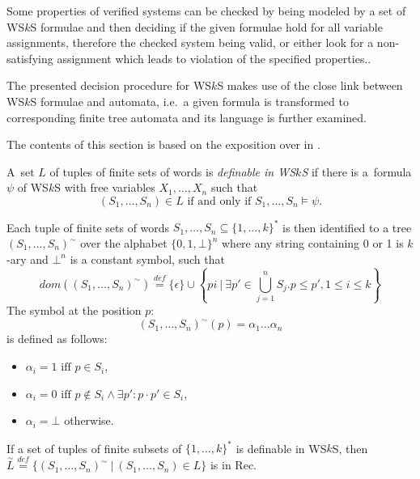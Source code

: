 Some properties of verified systems can be checked by being modeled by a set of
WS$k$S formulae and then deciding if the given formulae hold for all variable
assignments, therefore the checked system being valid, or either look for a
non-satisfying assignment which leads to violation of the specified properties..

The presented decision procedure for WS$k$S makes use of the close link between
WS$k$S formulae and automata, i.e.\ a given formula is transformed to
corresponding finite tree automata and its language is further examined. 

The contents of this section is based on the exposition over in \cite{tata}.

\begin{defz}
 A~set $L$ of tuples of finite sets of words is \emph{definable in WS$k$S} if
 there is a~formula $\psi$ of WS$k$S with free variables $X_1,\ldots,X_n$ such
 that \begin{equation}(S_1,\ldots,S_n) \in L \text{ if and only if }
 S_1,\ldots,S_n \models \psi.\end{equation}
\end{defz} Each tuple of finite sets of words $S_1,\ldots,S_n \subseteq
\{1,\ldots,k\}^*$ is then identified to a tree $(S_1,\ldots,S_n)^\sim$ over the
alphabet $\{0,1,\bot\}^n$ where any string containing 0 or 1 is $k$-ary and
$\bot^n$ is a constant symbol, such that
 \begin{equation}
  dom((S_1,\ldots,S_n)^\sim) \overset{\mathit{def}}{=} \{\epsilon\} \cup \left\{
  pi\ \Bigg|\ \exists p' \in \bigcup_{j = 1}^n S_j.p \leq p', 1 \leq i \leq
  k\right\}
 \end{equation}
The symbol at the position $p$: \begin{equation}(S_1,\ldots,S_n)^\sim(p) =
\alpha_1\ldots\alpha_n\end{equation} is defined as follows:
 \begin{itemize}
  \item $\alpha_i = 1 \text{ iff } p \in S_i$,
  \item $\alpha_i = 0 \text{ iff } p \notin S_i \wedge \exists p': p\cdot p' \in S_i$,
  \item $\alpha_i = \bot$ otherwise.
 \end{itemize}
 
\begin{lemma}
If a set of tuples of finite subsets of $\{1,\ldots,k\}^*$ is definable in
WS$k$S, then $\overset{\sim}{L} \overset{\mathit{def}}{=}
\{(S_1,\ldots,S_n)^\sim\ |\ (S_1,\ldots,S_n) \in L\}$ is in Rec.
\end{lemma}

